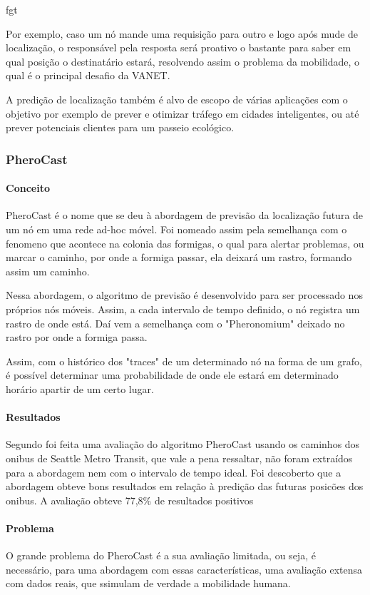fgt\documentclass[12pt, %
openright, 
oneside, %
a4paper,    %
brazil]{facom-ufu-abntex2}
\begin{document}
Por exemplo, caso um nó mande uma requisição para outro e logo após mude de localização, o responsável pela resposta será proativo o bastante para saber em qual posição o destinatário estará, resolvendo assim o problema da mobilidade, o qual é o principal desafio da VANET.

A predição de localização também é alvo de escopo de várias aplicações com o objetivo por exemplo de prever e otimizar tráfego em cidades inteligentes, ou até prever potenciais clientes para um passeio ecológico.

\subsubsection{PheroCast}
\paragraph{Conceito}
PheroCast é o nome que se deu à abordagem de previsão da localização futura de um nó em uma rede ad-hoc móvel. Foi nomeado assim pela semelhança com o fenomeno que acontece na colonia das formigas, o qual para alertar problemas, ou marcar o caminho, por onde a formiga passar, ela deixará um rastro, formando assim um caminho.

Nessa abordagem, o algoritmo de previsão é desenvolvido para ser processado nos próprios nós móveis. Assim, a cada intervalo de tempo definido, o nó registra um rastro de onde está. Daí vem a semelhança com o "Pheronomium" deixado no rastro por onde a formiga passa.

Assim, com o histórico dos "traces" de um determinado nó na forma de um grafo, é possível determinar uma probabilidade de onde ele estará em determinado horário apartir de um certo lugar.
\paragraph{Resultados}
Segundo \cite{6838650} foi feita uma avaliação do algoritmo PheroCast usando os caminhos dos onibus de Seattle Metro Transit, que vale a pena ressaltar, não foram extraídos para a abordagem nem com o intervalo de tempo ideal. Foi descoberto que a abordagem obteve bons resultados em relação à predição das futuras posicões dos onibus. A avaliação obteve 77,8\% de resultados positivos
\paragraph{Problema}
O grande problema do PheroCast é a sua avaliação limitada, ou seja, é necessário, para uma abordagem com essas características, uma avaliação extensa com dados reais, que ssimulam de verdade a mobilidade humana. 
\end{document}
